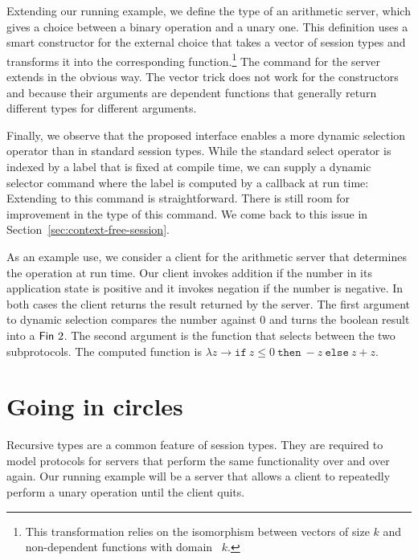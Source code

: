\documentclass[acmsmall,review,anonymous,screen]{acmart}
\begin{document}
Extending our running example, we define the type of an arithmetic server,
which gives a choice between a binary operation and a unary one. 
This definition uses a smart constructor {\Aamp} for the external choice that
takes a vector of session types and transforms it into the
corresponding function.\footnote{This transformation relies on the
  isomorphism between vectors of size $k$ and non-dependent functions with domain {\AFin~$k$}.}
\stExampleArithP
The command for the server extends in the obvious way. The vector
trick does not work for the {\ACommand} constructors {\ACSELECT} and
{\ACCHOICE} because their arguments are dependent functions that
generally return different types for different arguments.
\stArithpCommand

Finally, we observe that the proposed interface enables a more dynamic
selection operator than in standard session types. While the standard
select operator is indexed by a label that is fixed at compile time,
we can supply a dynamic selector command where the label is computed
by a callback  at run time:
\stDynamicBranchingCommand
Extending {\Aexecutor} to this command is straightforward.
There is still room for improvement in the type of this command. We
come back to this issue in Section~\ref{sec:context-free-session}.

As an example use, we consider a client for the arithmetic server that
determines the operation at run time. Our client invokes addition if
the number in its application state is positive and it invokes
negation if the number is negative. In both cases the client returns
the result returned by the server.
\stArithpClient
The first argument to dynamic selection compares the number against
$0$ and turns the boolean result into a $\AFin~2$. The second argument
is the function that selects between the two subprotocols. The
computed function is $\lambda z \to \mathtt{if}\ z\le0\ \mathtt{then}\
-z\ \mathtt{else}\ z+z$. 

\section{Going in circles}
\label{sec:going-circles}


Recursive types are a common feature of session types. They are required
to model protocols for servers that perform the same functionality
over and over again. Our running example will be a server that allows
a client to repeatedly perform a unary operation until the client
quits.
\end{document}
